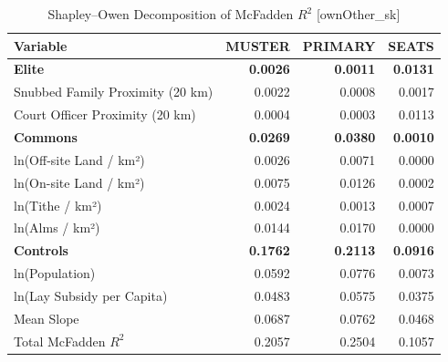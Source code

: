 \begin{table}[H]
\centering
\caption{Shapley--Owen Decomposition of McFadden $R^2$ [ownOther_sk]}
\label{tab:shapley_owen_ownOther_sk}
\begin{tabular}{lrrr}
\hline\hline
Variable & MUSTER & PRIMARY & SEATS \\
\hline
\textbf{Elite} & \textbf{0.0026} & \textbf{0.0011} & \textbf{0.0131} \\
\quad Snubbed Family Proximity (20 km) & 0.0022 & 0.0008 & 0.0017 \\
\quad Court Officer Proximity (20 km) & 0.0004 & 0.0003 & 0.0113 \\
\textbf{Commons} & \textbf{0.0269} & \textbf{0.0380} & \textbf{0.0010} \\
\quad ln(Off-site Land / km²) & 0.0026 & 0.0071 & 0.0000 \\
\quad ln(On-site Land / km²) & 0.0075 & 0.0126 & 0.0002 \\
\quad ln(Tithe / km²) & 0.0024 & 0.0013 & 0.0007 \\
\quad ln(Alms / km²) & 0.0144 & 0.0170 & 0.0000 \\
\textbf{Controls} & \textbf{0.1762} & \textbf{0.2113} & \textbf{0.0916} \\
\quad ln(Population) & 0.0592 & 0.0776 & 0.0073 \\
\quad ln(Lay Subsidy per Capita) & 0.0483 & 0.0575 & 0.0375 \\
\quad Mean Slope & 0.0687 & 0.0762 & 0.0468 \\
\hline
Total McFadden $R^2$ & 0.2057 & 0.2504 & 0.1057 \\
\hline\hline
\end{tabular}
\end{table}

